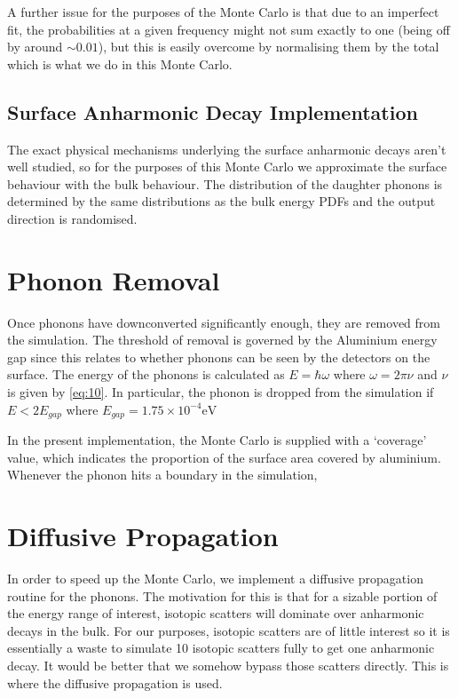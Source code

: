 \documentclass[11pt]{article}
\newcommand{\e}[1]{\times 10^{#1}}
\begin{document}
A further issue for the purposes of the Monte Carlo is that due to an imperfect fit, the probabilities at a given frequency might not sum exactly
to one (being off by around $\sim 0.01$), but this is easily overcome by normalising them by the total which is what we do in this Monte Carlo.

\subsection*{Surface Anharmonic Decay Implementation}
The exact physical mechanisms underlying the surface anharmonic decays aren't well studied, so for the purposes of this Monte Carlo we approximate
the surface behaviour with the bulk behaviour. The distribution of the daughter phonons is determined by the same distributions as the bulk 
energy PDFs and the output direction is randomised.

\section*{Phonon Removal}
Once phonons have downconverted significantly enough, they are removed from the simulation. The threshold of removal is governed by the Aluminium 
energy gap since this relates to whether phonons can be seen by the detectors on the surface. The energy of the phonons is calculated as 
$E = \hbar \omega$ where $\omega = 2\pi \nu$ and $\nu$ is given by \eqref{eq:10}. In particular, the phonon is dropped from the simulation if 
$E < 2E_{gap}$ where $E_{gap} = 1.75\e{-4} \si{\electronvolt}$

In the present implementation, the Monte Carlo is supplied with a `coverage' value, which indicates the proportion of the surface area covered
by aluminium. Whenever the phonon hits a boundary in the simulation, 

\section*{Diffusive Propagation}
In order to speed up the Monte Carlo, we implement a diffusive propagation routine for the phonons. The motivation for this is that for a sizable 
portion of the energy range of interest, isotopic scatters will dominate over anharmonic decays in the bulk. For our purposes, isotopic scatters 
are of little interest so it is essentially a waste to simulate 10 isotopic scatters fully to get one anharmonic decay. It would be better that we 
somehow bypass those scatters directly. This is where the diffusive propagation is used. 
\end{document}
